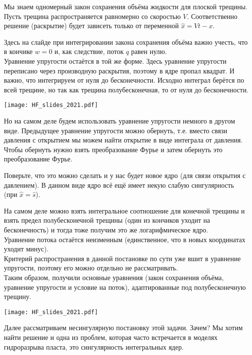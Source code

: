 \documentclass[main.tex]{subfiles}
\begin{document}
Мы знаем одномерный закон сохранения объёма жидкости для плоской трещины.
Пусть трещина распространяется равномерно со скоростью $V$.
Соответственно решение (раскрытие) будет зависеть только от переменной $\hat{x}=Vt-x$.

Здесь на слайде при интегрировании закона сохранения объёма важно учесть, что в кончике $w=0$ и, как следствие, поток $q$ равен нулю.
\\

Уравнение упругости остаётся в той же форме.
Здесь уравнение упругости переписано через производную раскрытия, поэтому в ядре пропал квадрат.
И важно, что интегрируем от нуля до бесконечности.
Исходно интеграл берётся по всей трещине, но так как трещина полубесконечная, то от нуля до бесконечности.

\texttt{[image: HF\_slides\_2021.pdf]}

Но на самом деле будем использовать уравнение упругости немного в другом виде.
Предыдущее уравнение упругости можно обернуть, т.е. вместо связи давления с открытием мы можем найти открытие в виде интеграла от давления.
Чтобы обернуть нужно взять преобразование Фурье и затем обернуть это преобразование Фурье.

Поверьте, что это можно сделать и у нас будет новое ядро (для связи открытия с давлением).
В данном виде ядро всё ещё имеет некую слабую сингулярность (при $\hat{x}=\hat{s}$).

На самом деле можно взять интегральное соотношение для конечной трещины и взять предел полубесконечной трещины (один из кончиков уходит на бесконечность) и тогда тоже получим это же логарифмическое ядро.
\\

Уравнение потока остаётся неизменным (единственное, что в новых координатах уходит минус).
\\

Критерий распространения в данной постановке по сути уже вшит в уравнение упругости, поэтому его можно отдельно не рассматривать.
\\

Таким образом, получили основные уравнения (закон сохранения объёма, уравнение упругости и условие на поток), адаптированные под полубесконечную трещину.

\texttt{[image: HF\_slides\_2021.pdf]}

Далее рассматриваем несингулярную постановку этой задачи.
Зачем?
Мы хотим найти решение и одна из проблем, которая часто встречается в моделях гидроразрыва пласта, это сингулярность интегральных ядер.
\end{document}
